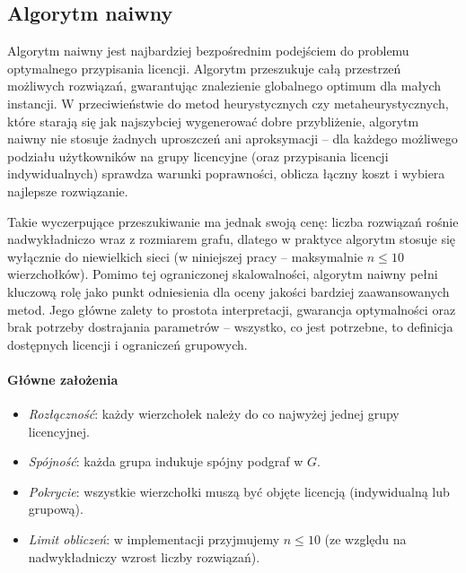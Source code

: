 \subsection{Algorytm naiwny}

Algorytm naiwny jest najbardziej bezpośrednim podejściem do problemu optymalnego przypisania licencji. Algorytm przeszukuje całą przestrzeń możliwych rozwiązań, gwarantując znalezienie globalnego optimum dla małych instancji. W przeciwieństwie do metod heurystycznych czy metaheurystycznych, które starają się jak najszybciej wygenerować dobre przybliżenie, algorytm naiwny nie stosuje żadnych uproszczeń ani aproksymacji – dla każdego możliwego podziału użytkowników na grupy licencyjne (oraz przypisania licencji indywidualnych) sprawdza warunki poprawności, oblicza łączny koszt i wybiera najlepsze rozwiązanie.

Takie wyczerpujące przeszukiwanie ma jednak swoją cenę: liczba rozwiązań rośnie nadwykładniczo wraz z rozmiarem grafu, dlatego w praktyce algorytm stosuje się wyłącznie do niewielkich sieci (w niniejszej pracy – maksymalnie $n\le10$ wierzchołków). Pomimo tej ograniczonej skalowalności, algorytm naiwny pełni kluczową rolę jako punkt odniesienia dla oceny jakości bardziej zaawansowanych metod. Jego główne zalety to prostota interpretacji, gwarancja optymalności oraz brak potrzeby dostrajania parametrów – wszystko, co jest potrzebne, to definicja dostępnych licencji i ograniczeń grupowych.

\paragraph{Główne założenia}
\begin{itemize}
  \item \emph{Rozłączność}: każdy wierzchołek należy do co najwyżej jednej grupy licencyjnej.
  \item \emph{Spójność}: każda grupa indukuje spójny podgraf w $G$.
  \item \emph{Pokrycie}: wszystkie wierzchołki muszą być objęte licencją (indywidualną lub grupową).
  \item \emph{Limit obliczeń}: w implementacji przyjmujemy $n\le10$ (ze względu na nadwykładniczy wzrost liczby rozwiązań).
\end{itemize}


